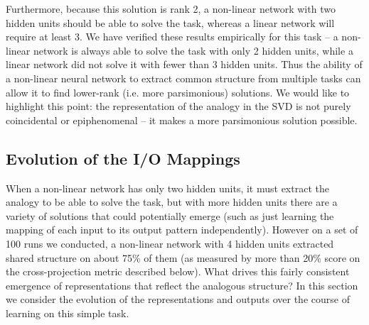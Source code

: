 \documentclass[10pt,letterpaper]{article}
\begin{document}
Furthermore, because this solution is rank 2, a non-linear network with two hidden units should be able to solve the task, whereas a linear network will require at least 3. We have verified these results empirically for this task -- a non-linear network is always able to solve the task with only 2 hidden units, while a linear network did not solve it with fewer than 3 hidden units. Thus the ability of a non-linear neural network to extract common structure from multiple tasks can allow it to find lower-rank (i.e. more parsimonious) solutions. We would like to highlight this point: the representation of the analogy in the SVD is not purely coincidental or epiphenomenal -- it makes a more parsimonious solution possible. \par
\subsection{Evolution of the I/O Mappings}
%
When a non-linear network has only two hidden units, it must extract the analogy to be able to solve the task, but with more hidden units there are a variety of solutions that could potentially emerge (such as just learning the mapping of each input to its output pattern independently). However on a set of 100 runs we conducted, a non-linear network with 4 hidden units extracted shared structure on about 75\% of them (as measured by more than 20\% score on the cross-projection metric described below). What drives this fairly consistent emergence of representations that reflect the analogous structure? In this section we consider the evolution of the representations and outputs over the course of learning on this simple task. \par 
\end{document}
